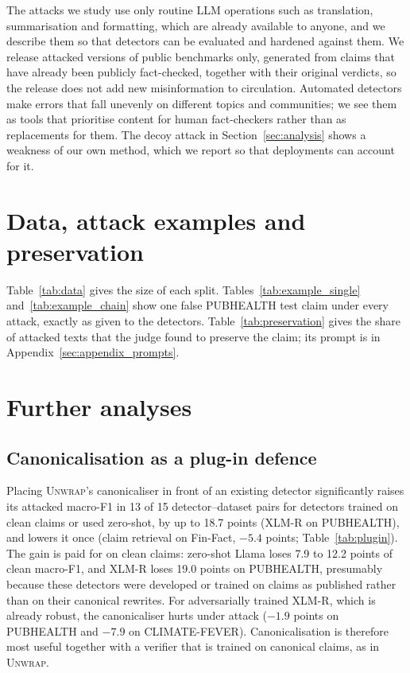 \documentclass[11pt]{article}
\newcommand{\method}{\textsc{Unwrap}}
\begin{document}
The attacks we study use only routine LLM operations such as translation, summarisation and formatting, which are already available to anyone, and we describe them so that detectors can be evaluated and hardened against them. We release attacked versions of public benchmarks only, generated from claims that have already been publicly fact-checked, together with their original verdicts, so the release does not add new misinformation to circulation. Automated detectors make errors that fall unevenly on different topics and communities; we see them as tools that prioritise content for human fact-checkers rather than as replacements for them. The decoy attack in Section~\ref{sec:analysis} shows a weakness of our own method, which we report so that deployments can account for it.



\appendix
\section{Data, attack examples and preservation}
\label{sec:appendix_attacks}



Table~\ref{tab:data} gives the size of each split. Tables~\ref{tab:example_single} and~\ref{tab:example_chain} show one false PUBHEALTH test claim under every attack, exactly as given to the detectors. Table~\ref{tab:preservation} gives the share of attacked texts that the judge found to preserve the claim; its prompt is in Appendix~\ref{sec:appendix_prompts}.




\section{Further analyses}
\label{sec:appendix_analyses}

\subsection{Canonicalisation as a plug-in defence}

Placing \method{}'s canonicaliser in front of an existing detector significantly raises its attacked macro-F1 in 13 of 15 detector--dataset pairs for detectors trained on clean claims or used zero-shot, by up to 18.7 points (XLM-R on PUBHEALTH), and lowers it once (claim retrieval on Fin-Fact, $-5.4$ points; Table~\ref{tab:plugin}). The gain is paid for on clean claims: zero-shot Llama loses 7.9 to 12.2 points of clean macro-F1, and XLM-R loses 19.0 points on PUBHEALTH, presumably because these detectors were developed or trained on claims as published rather than on their canonical rewrites. For adversarially trained XLM-R, which is already robust, the canonicaliser hurts under attack ($-1.9$ points on PUBHEALTH and $-7.9$ on CLIMATE-FEVER). Canonicalisation is therefore most useful together with a verifier that is trained on canonical claims, as in \method{}.
\end{document}
